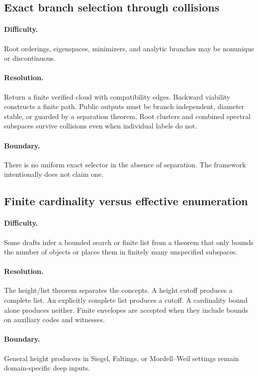 \subsection{Exact branch selection through collisions}

\paragraph{Difficulty.}
Root orderings, eigenspaces, minimizers, and analytic branches may be nonunique or discontinuous.

\paragraph{Resolution.}
Return a finite verified cloud with compatibility edges.  Backward viability constructs a finite path.
Public outputs must be branch independent, diameter stable, or guarded by a separation theorem.  Root
clusters and combined spectral subspaces survive collisions even when individual labels do not.

\paragraph{Boundary.}
There is no uniform exact selector in the absence of separation.  The framework intentionally does not
claim one.

\subsection{Finite cardinality versus effective enumeration}

\paragraph{Difficulty.}
Some drafts infer a bounded search or finite list from a theorem that only bounds the number of objects or
places them in finitely many unspecified subspaces.

\paragraph{Resolution.}
The height/list theorem separates the concepts.  A height cutoff produces a complete list.  An explicitly
complete list produces a cutoff.  A cardinality bound alone produces neither.  Finite envelopes are accepted
when they include bounds on auxiliary codes and witnesses.

\paragraph{Boundary.}
General height producers in Siegel, Faltings, or Mordell--Weil settings remain domain-specific deep inputs.

